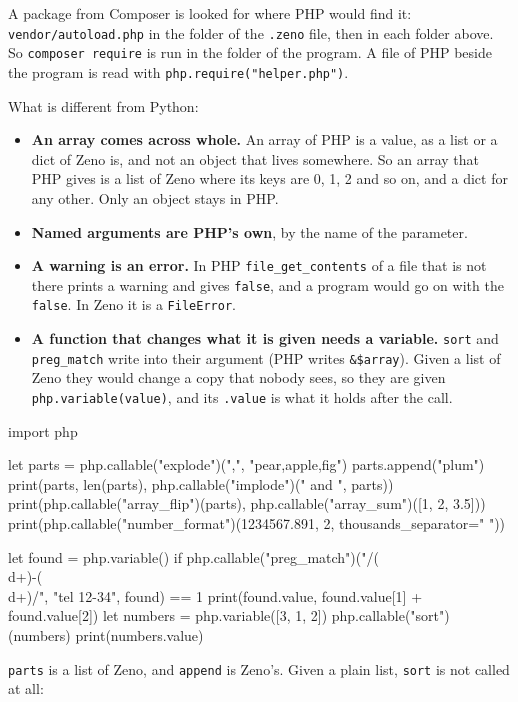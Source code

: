 A package from Composer is looked for where PHP would find it:
\verb|vendor/autoload.php| in the folder of the \verb|.zeno| file,
then in each folder above. So \verb|composer require| is run in the
folder of the program. A file of PHP beside the program is read with
\verb|php.require("helper.php")|.

What is different from Python:

\begin{itemize}
\item \textbf{An array comes across whole.} An array of PHP is a value,
  as a list or a dict of Zeno is, and not an object that lives
  somewhere. So an array that PHP gives is a list of Zeno where its
  keys are 0, 1, 2 and so on, and a dict for any other. Only an object
  stays in PHP.
\item \textbf{Named arguments are PHP's own}, by the name of the
  parameter.
\item \textbf{A warning is an error.} In PHP \verb|file_get_contents|
  of a file that is not there prints a warning and gives \verb|false|,
  and a program would go on with the \verb|false|. In Zeno it is a
  \verb|FileError|.
\item \textbf{A function that changes what it is given needs a
  variable.} \verb|sort| and \verb|preg_match| write into their
  argument (PHP writes \verb|&$array|). Given a list of Zeno they would
  change a copy that nobody sees, so they are given
  \verb|php.variable(value)|, and its \verb|.value| is what it holds
  after the call.
\end{itemize}

\begin{zeno}[file=parts.zeno, dir=php]
import php

let parts = php.callable("explode")(",", "pear,apple,fig")
parts.append("plum")
print(parts, len(parts), php.callable("implode")(" and ", parts))
print(php.callable("array_flip")(parts), php.callable("array_sum")([1, 2, 3.5]))
print(php.callable("number_format")(1234567.891, 2, thousands_separator=" "))

let found = php.variable()
if php.callable("preg_match")("/(\\d+)-(\\d+)/", "tel 12-34", found) == 1 {
    print(found.value, found.value[1] + found.value[2])
}
let numbers = php.variable([3, 1, 2])
php.callable("sort")(numbers)
print(numbers.value)
\end{zeno}

\verb|parts| is a list of Zeno, and \verb|append| is Zeno's. Given a
plain list, \verb|sort| is not called at all:

